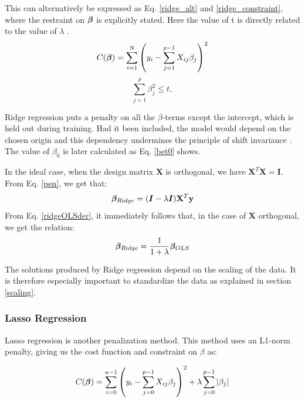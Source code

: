 This can alternatively be expressed as Eq. \ref{ridge_alt} and \ref{ridge_constraint}, where the restraint on $\boldsymbol{\beta}$ is explicitly stated. Here the value of t is directly related to the value of $\lambda$ \citep[p. 63]{hastie}.
\begin{equation}\label{ridge_alt}
    C(\boldsymbol{\beta}) = \sum_{i=1}^N \left(y_i - \sum_{j=1}^{p-1} X_{ij}\beta_j \right)^2
\end{equation}
\begin{equation}\label{ridge_constraint}
    \sum_{j=1}^p \beta_j^2 \leq t, 
\end{equation}

Ridge regression puts a penalty on all the $\beta$-terms except the intercept, which is held out during training. Had it been included, the model would depend on the chosen origin and this dependency undermines the principle of shift invariance \citep[p. 63]{hastie}.
The value of $\beta_0$ is later calculated as Eq. \ref{bet0} shows. 

In the ideal case, when the design matrix $\mathbf{X}$ is orthogonal, we have $\mathbf{X}^T\mathbf{X} = \boldsymbol{I}$. From Eq. \ref{pen}, we get that:
\begin{equation}\label{ridgeOLSder}
    \boldsymbol{\beta}_{Ridge} = (\boldsymbol{I} - \lambda\boldsymbol{I}) \mathbf{X}^T \mathbf{y}
\end{equation}
From Eq. \ref{ridgeOLSder}, it immediately follows that, in the case of $\mathbf{X}$ orthogonal, we get the relation:
\begin{equation}\label{ridgeOLS}
    \boldsymbol{\beta}_{Ridge} = \frac{1}{1+\lambda}\boldsymbol{\beta}_{OLS}
\end{equation}

The solutions produced by Ridge regression depend on the scaling of the data. It is therefore especially important to standardize the data as explained in section \ref{scaling}.



\subsubsection{Lasso Regression}

Lasso regression is another penalization method. This method uses an L1-norm penalty, giving us the cost function and constraint on $\beta$ as: 

\begin{equation}\label{lasso}
     C(\boldsymbol{\beta}) = \sum_{i=0}^{n-1} \left( y_i - \sum_{j=0}^{p-1} X_{ij}\beta_j \right)^2 + \lambda\sum_{j=0}^{p-1} |\beta_j|
\end{equation}

